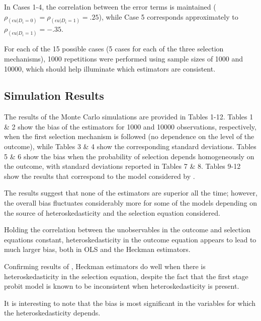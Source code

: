 \documentclass{article}
\begin{document}
In Cases 1-4, the correlation between the error terms is maintained ($\rho_{(\epsilon u|D_i=0)}=\rho_{(\epsilon u|D_i=1)}=.25$), while Case 5 corresponds approximately to $\rho_{(\epsilon u|D_i=1)}=-.35$.
  
For each of the 15 possible cases (5 cases for each of the three selection mechanisms), 1000 repetitions were performed using sample sizes of 1000 and 10000, which should help illuminate which estimators are consistent.

\subsection{Simulation Results}
The results of the Monte Carlo simulations are provided in Tables 1-12.  Tables 1 \& 2 show the bias of the estimators for 1000 and 10000 observations, respectively, when the first selection mechanism is followed (no dependence on the level of the outcome), while Tables 3 \& 4 show the corresponding standard deviations.  Tables 5 \& 6 show the bias when the  probability of selection depends homogeneously on the outcome, with standard deviations reported in Tables 7 \& 8.  Tables 9-12 show the results that correspond to the model considered by \citet{reichert2014}.  

The results suggest that none of the estimators are superior all the time; however, the overall bias fluctuates considerably more for some of the models depending on the source of heteroskedasticity and the selection equation considered.  

Holding the correlation between the unobservables in the outcome and selection equations constant, heteroskedasticity in the outcome equation appears to lead to much larger bias, both in OLS and the Heckman estimators.

Confirming results of \citet{fernandez1999}, Heckman estimators do well when there is heteroskedasticity in the selection equation, despite the fact that the first stage probit model is known to be inconsistent when heteroskedasticity is present.  

It is interesting to note that the bias is most significant in the variables for which the heteroskedasticity depends.  

\begin{table}[htbp]


\end{table}
\end{document}
